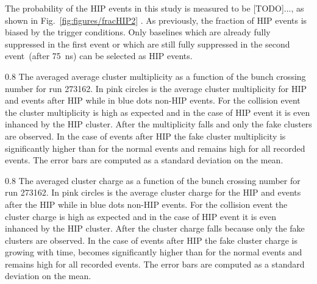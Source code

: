 
The probability of the HIP events in this study is measured to be [TODO]..., as shown in Fig.~\ref{fig:figures/fracHIP2} . As previously, the fraction of HIP events is biased by the trigger conditions. Only baselines which are already fully suppressed in the first event or which are still fully suppressed in the second event~(after 75~ns) can be selected as HIP events.


                 {0.8}       %
                 {The averaged average cluster multiplicity as a function of the bunch crossing number for run 273162. In pink circles is the average cluster multiplicity for HIP and events after HIP while in blue dots non-HIP events. For the collision event the cluster multiplicity is high as expected and in the case of HIP event it is even inhanced by the HIP cluster. After the multiplicity falls and only the fake clusters are observed. In the case of events after HIP the fake cluster multiplicity is significantly higher than for the normal events and remains high for all recorded events. The error bars are computed as a standard deviation on the mean. } %

                 {0.8}       %
                 {The averaged cluster charge as a function of the bunch crossing number for run 273162. In pink circles is the average cluster charge for the HIP and events after the HIP while in blue dots non-HIP events. For the collision event the cluster charge is high as expected and in the case of HIP event it is even inhanced by the HIP cluster. After the cluster charge falls because only the fake clusters are observed. In the case of events after HIP the fake cluster charge is growing with time, becomes significantly higher than for the normal events and remains high for all recorded events. The error bars are computed as a standard deviation on the mean. } %



